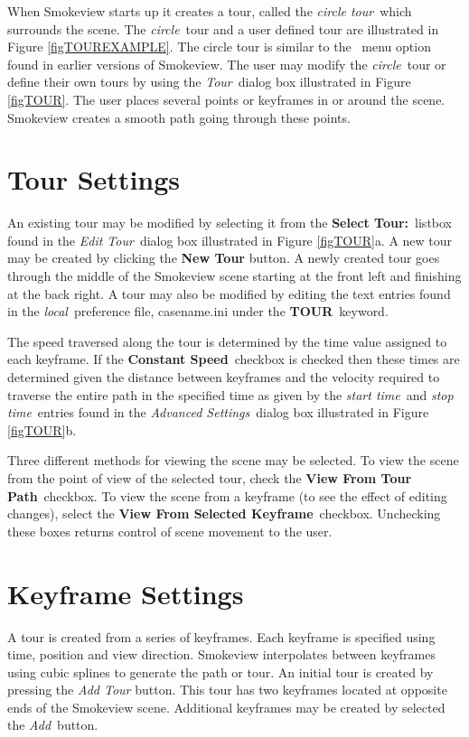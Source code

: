 \documentclass[11pt,twoside]{book}
\newcommand{\tourmenu}{\fbox{\tt Tour} }
\begin{document}
When Smokeview starts up it creates a tour, called the {\em circle
tour}\ which surrounds the scene.  The {\em circle}\ tour and a user
defined tour are illustrated in Figure \ref{figTOUREXAMPLE}. The
circle tour is similar to the \tourmenu\ menu option found in
earlier versions of Smokeview. The user may modify the {\em circle}\
tour or define their own tours by using the {\em Tour}\ dialog box
illustrated in Figure \ref{figTOUR}. The user places several
points or keyframes in or around the scene. Smokeview creates a
smooth path going through these points.

\section{Tour Settings}
An existing tour may be modified by selecting it from the {\bf
Select Tour:}\ listbox found in the {\em Edit Tour}\ dialog box illustrated in Figure \ref{figTOUR}a.  A new tour
may be created by clicking the {\bf New Tour} button. A newly
created tour goes through the middle of the Smokeview scene
starting at the front left and finishing at the back right. A tour
may also be modified by editing the text entries found in the
{\em local}\ preference file, casename.ini under the {\bf TOUR}\
keyword.

The speed traversed along the tour is determined by the time value
assigned to each keyframe.   If the {\bf Constant Speed}\ checkbox
is checked then these times are determined given the distance
between keyframes and the velocity required to traverse the entire
path in the specified time as given by the {\em start time}\ and
{\em stop time}\ entries found in the {\em Advanced Settings}\ dialog
box illustrated in Figure \ref{figTOUR}b.


Three different methods for viewing the scene may be selected.  To
view the scene from the point of view of the selected tour, check
the {\bf View From Tour Path}\ checkbox. To view the scene from a
keyframe (to see the effect of editing changes), select the {\bf
View From Selected Keyframe}\ checkbox. Unchecking these boxes
returns control of scene movement to the user.

\section{Keyframe Settings}
A tour is created from a series of keyframes.  Each keyframe is specified using time, position and view direction.  Smokeview interpolates between keyframes using cubic splines to generate the path or tour.  An initial tour is created by pressing the {\em Add Tour} button.  This tour has two keyframes located at opposite ends of the Smokeview scene.  Additional keyframes may be created by selected the {\em Add}\ button.
\end{document}
